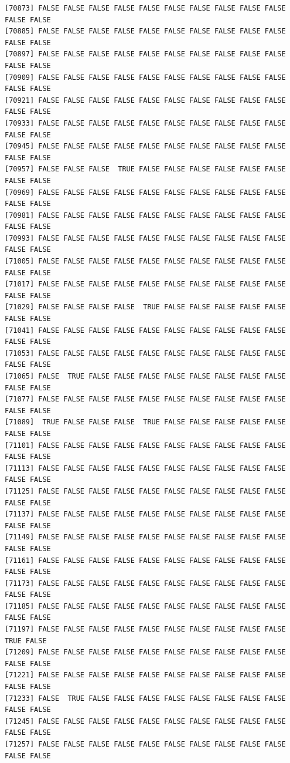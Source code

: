 \documentclass[
  a4paper,
  DIV=11,
  numbers=noendperiod]{scrartcl}
\begin{document}
\begin{verbatim}
[70873] FALSE FALSE FALSE FALSE FALSE FALSE FALSE FALSE FALSE FALSE FALSE FALSE
[70885] FALSE FALSE FALSE FALSE FALSE FALSE FALSE FALSE FALSE FALSE FALSE FALSE
[70897] FALSE FALSE FALSE FALSE FALSE FALSE FALSE FALSE FALSE FALSE FALSE FALSE
[70909] FALSE FALSE FALSE FALSE FALSE FALSE FALSE FALSE FALSE FALSE FALSE FALSE
[70921] FALSE FALSE FALSE FALSE FALSE FALSE FALSE FALSE FALSE FALSE FALSE FALSE
[70933] FALSE FALSE FALSE FALSE FALSE FALSE FALSE FALSE FALSE FALSE FALSE FALSE
[70945] FALSE FALSE FALSE FALSE FALSE FALSE FALSE FALSE FALSE FALSE FALSE FALSE
[70957] FALSE FALSE FALSE  TRUE FALSE FALSE FALSE FALSE FALSE FALSE FALSE FALSE
[70969] FALSE FALSE FALSE FALSE FALSE FALSE FALSE FALSE FALSE FALSE FALSE FALSE
[70981] FALSE FALSE FALSE FALSE FALSE FALSE FALSE FALSE FALSE FALSE FALSE FALSE
[70993] FALSE FALSE FALSE FALSE FALSE FALSE FALSE FALSE FALSE FALSE FALSE FALSE
[71005] FALSE FALSE FALSE FALSE FALSE FALSE FALSE FALSE FALSE FALSE FALSE FALSE
[71017] FALSE FALSE FALSE FALSE FALSE FALSE FALSE FALSE FALSE FALSE FALSE FALSE
[71029] FALSE FALSE FALSE FALSE  TRUE FALSE FALSE FALSE FALSE FALSE FALSE FALSE
[71041] FALSE FALSE FALSE FALSE FALSE FALSE FALSE FALSE FALSE FALSE FALSE FALSE
[71053] FALSE FALSE FALSE FALSE FALSE FALSE FALSE FALSE FALSE FALSE FALSE FALSE
[71065] FALSE  TRUE FALSE FALSE FALSE FALSE FALSE FALSE FALSE FALSE FALSE FALSE
[71077] FALSE FALSE FALSE FALSE FALSE FALSE FALSE FALSE FALSE FALSE FALSE FALSE
[71089]  TRUE FALSE FALSE FALSE  TRUE FALSE FALSE FALSE FALSE FALSE FALSE FALSE
[71101] FALSE FALSE FALSE FALSE FALSE FALSE FALSE FALSE FALSE FALSE FALSE FALSE
[71113] FALSE FALSE FALSE FALSE FALSE FALSE FALSE FALSE FALSE FALSE FALSE FALSE
[71125] FALSE FALSE FALSE FALSE FALSE FALSE FALSE FALSE FALSE FALSE FALSE FALSE
[71137] FALSE FALSE FALSE FALSE FALSE FALSE FALSE FALSE FALSE FALSE FALSE FALSE
[71149] FALSE FALSE FALSE FALSE FALSE FALSE FALSE FALSE FALSE FALSE FALSE FALSE
[71161] FALSE FALSE FALSE FALSE FALSE FALSE FALSE FALSE FALSE FALSE FALSE FALSE
[71173] FALSE FALSE FALSE FALSE FALSE FALSE FALSE FALSE FALSE FALSE FALSE FALSE
[71185] FALSE FALSE FALSE FALSE FALSE FALSE FALSE FALSE FALSE FALSE FALSE FALSE
[71197] FALSE FALSE FALSE FALSE FALSE FALSE FALSE FALSE FALSE FALSE  TRUE FALSE
[71209] FALSE FALSE FALSE FALSE FALSE FALSE FALSE FALSE FALSE FALSE FALSE FALSE
[71221] FALSE FALSE FALSE FALSE FALSE FALSE FALSE FALSE FALSE FALSE FALSE FALSE
[71233] FALSE  TRUE FALSE FALSE FALSE FALSE FALSE FALSE FALSE FALSE FALSE FALSE
[71245] FALSE FALSE FALSE FALSE FALSE FALSE FALSE FALSE FALSE FALSE FALSE FALSE
[71257] FALSE FALSE FALSE FALSE FALSE FALSE FALSE FALSE FALSE FALSE FALSE FALSE

\end{verbatim}
\end{document}
